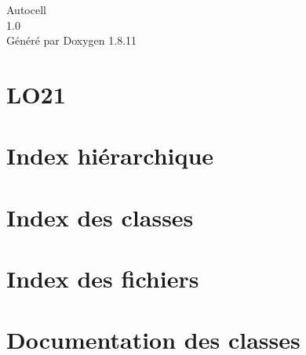 \documentclass[twoside]{book}
\newcommand{\+}{\discretionary{\mbox{\scriptsize$\hookleftarrow$}}{}{}}
\newcommand{\clearemptydoublepage}{%
  \newpage{\pagestyle{empty}\cleardoublepage}%
}
\begin{document}
\hypersetup{pageanchor=false,
             bookmarksnumbered=true,
             pdfencoding=unicode
            }
\begin{titlepage}
\vspace*{7cm}
\begin{center}%
{\Large Autocell \\[1ex]\large 1.\+0 }\\
\vspace*{1cm}
{\large Généré par Doxygen 1.8.11}\\
\end{center}
\end{titlepage}
\clearemptydoublepage
\tableofcontents
\clearemptydoublepage
{}
\hypersetup{pageanchor=true}

\chapter{L\+O21}
\label{md__home_thomaspaita_Bureau_info_LO21_LO21_README}
\hypertarget{md__home_thomaspaita_Bureau_info_LO21_LO21_README}{}

\chapter{Index hiérarchique}

\chapter{Index des classes}

\chapter{Index des fichiers}

\chapter{Documentation des classes}


























\end{document}

